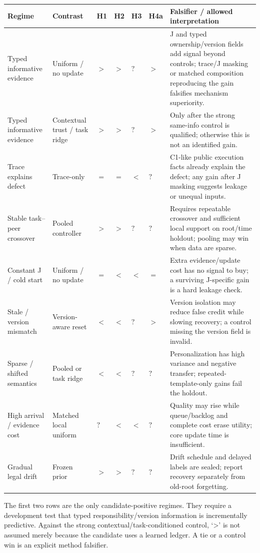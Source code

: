 \documentclass[10pt,a4paper]{article}
\begin{document}
\begin{center}\scriptsize
\begin{tabularx}{\linewidth}{@{}L{.18\linewidth}L{.23\linewidth}C{.055\linewidth}C{.055\linewidth}C{.055\linewidth}C{.055\linewidth}X@{}}\toprule
Regime & Contrast & H1 & H2 & H3 & H4a & Falsifier / allowed interpretation\\\midrule
Typed informative evidence & Uniform / no update & $>$ & $>$ & $?$ & $>$ & J and typed ownership/version fields add signal beyond controls; trace/J masking or matched composition reproducing the gain falsifies mechanism superiority.\\
Typed informative evidence & Contextual trust / task ridge & $>$ & $>$ & $?$ & $>$ & Only after the strong same-info control is qualified; otherwise this is not an identified gain.\\
Trace explains defect & Trace-only & $=$ & $=$ & $<$ & $?$ & C1-like public execution facts already explain the defect; any gain after J masking suggests leakage or unequal inputs.\\
Stable task--peer crossover & Pooled controller & $>$ & $>$ & $?$ & $?$ & Requires repeatable crossover and sufficient local support on root/time holdout; pooling may win when data are sparse.\\
Constant J / cold start & Uniform / no update & $=$ & $<$ & $<$ & $=$ & Extra evidence/update cost has no signal to buy; a surviving J-specific gain is a hard leakage check.\\
Stale / version mismatch & Version-aware reset & $<$ & $<$ & $?$ & $>$ & Version isolation may reduce false credit while slowing recovery; a control missing the version field is invalid.\\
Sparse / shifted semantics & Pooled or task ridge & $<$ & $<$ & $?$ & $?$ & Personalization has high variance and negative transfer; repeated-template-only gains fail the holdout.\\
High arrival / evidence cost & Matched local uniform & $?$ & $<$ & $<$ & $?$ & Quality may rise while queue/backlog and complete cost erase utility; core update time is insufficient.\\
Gradual legal drift & Frozen prior & $>$ & $>$ & $?$ & $?$ & Drift schedule and delayed labels are sealed; report recovery separately from old-root forgetting.\\\bottomrule
\end{tabularx}\end{center}

The first two rows are the only candidate-positive regimes. They require a development
test that typed responsibility/version information is incrementally predictive. Against
the strong contextual/task-conditioned control, `>' is not assumed merely because the
candidate uses a learned ledger. A tie or a control win is an explicit method falsifier.
\end{document}
